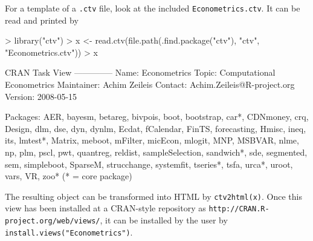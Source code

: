 \documentclass[a4paper]{article}
\begin{document}
For a template of a \verb/.ctv/ file, look at the included \verb/Econometrics.ctv/.
It can be read and printed by

\begin{Schunk}
\begin{Sinput}
> library("ctv")
> x <- read.ctv(file.path(.find.package("ctv"), "ctv", "Econometrics.ctv"))
> x
\end{Sinput}
\begin{Soutput}
CRAN Task View
--------------
Name:       Econometrics
Topic:      Computational Econometrics
Maintainer: Achim Zeileis
Contact:    Achim.Zeileis@R-project.org
Version:    2008-05-15

Packages:   AER, bayesm, betareg, bivpois, boot, bootstrap, car*, CDNmoney,
            crq, Design, dlm, dse, dyn, dynlm, Ecdat, fCalendar, FinTS,
            forecasting, Hmisc, ineq, its, lmtest*, Matrix, meboot, mFilter,
            micEcon, mlogit, MNP, MSBVAR, nlme, np, plm, pscl, pwt, quantreg,
            reldist, sampleSelection, sandwich*, sde, segmented, sem,
            simpleboot, SparseM, strucchange, systemfit, tseries*, tsfa, urca*,
            uroot, vars, VR, zoo*
            (* = core package)
\end{Soutput}
\end{Schunk}

The resulting object can be transformed into HTML by \verb/ctv2html(x)/.
Once this view has been installed at a CRAN-style repository as
\texttt{http://CRAN.R-project.org/web/views/}, it can be installed by
the user by \verb/install.views("Econometrics")/.
\end{document}
